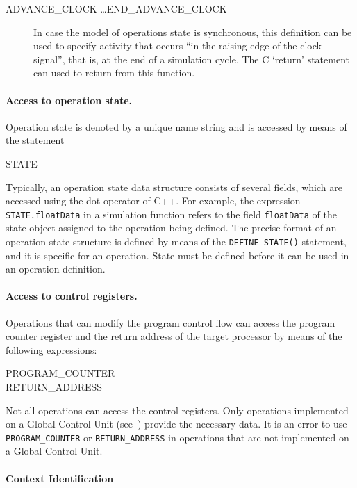 \documentclass[twoside]{tceusermanual}
\begin{document}
\begin{description}
\item[ADVANCE\_CLOCK \ldots END\_ADVANCE\_CLOCK]%
  In case the model of operations state is synchronous, this definition can
  be used to specify activity that occurs ``in the raising edge of the clock
  signal'', that is, at the end of a simulation cycle. The C `return'
  statement can used to return from this function.
\end{description}

\paragraph{Access to operation state.}
Operation state is denoted by a unique name string and is accessed by means
of the statement
\begin{description}
\item[STATE]
\end{description}

Typically, an operation state data structure consists of several fields,
which are accessed using the dot operator of C++.  For example, the
expression \verb#STATE.floatData# in a simulation function refers to the
field \verb#floatData# of the state object assigned to the operation
being defined.  The precise format of an
operation state structure is defined by means of the \verb#DEFINE_STATE()#
statement, and it is specific for an operation. State must be defined before it
can be used in an operation definition.

\paragraph{Access to control registers.}
Operations that can modify the program control flow can access the program
counter register and the return address of the target processor by means of
the following expressions:
\begin{description}
\item[PROGRAM\_COUNTER] %
\item[RETURN\_ADDRESS] %
\end{description}
Not all operations can access the control registers.  Only operations
implemented on a Global Control Unit (see~\cite{ADF-specs}) provide the
necessary data.  It is an error to use \verb#PROGRAM_COUNTER# or
\verb#RETURN_ADDRESS# in operations that are not implemented on a Global
Control Unit.

\paragraph{Context Identification}
\end{document}
